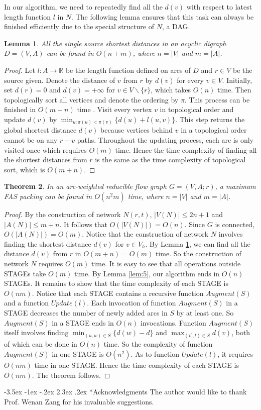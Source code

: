 \documentclass[11pt]{article}
\makeatletter
\newtheorem{theorem}{Theorem}[section]
\newtheorem{lemma}[theorem]{Lemma}
\renewcommand\section{%
  \@startsection{section}{1}
                {\z@}%
                {-3.5ex \@plus -1ex \@minus -.2ex}%
                {2.3ex \@plus.2ex}%
                {\large\bfseries}%
}
\makeatother
\begin{document}
In our algorithm, we need to repeatedly find all the $d(v)$ with respect to latest length function $l$ in $N$. The following lemma ensures that this task can always be finished efficiently due to the special structure of $N$, a DAG.

\begin{lemma}
\label{lem:6}
All the single source shortest distances in an acyclic digraph $D=(V,A)$ can be found in $O(n+m)$, where $n=\lvert V \rvert$ and $m=\lvert A \rvert$.
\end{lemma}
\begin{proof}
Let $l:A\rightarrow \mathbb{R}$ be the length function defined on arcs of $D$ and $r\in V$ be the source given. Denote the distance of $v$ from $r$ by $d(v)$ for every $v\in V$. Initially, set $d(r)=0$ and $d(v)=+\infty$ for $v\in V\backslash \{r\}$, which takes $O(n)$ time. Then topologically sort all vertices and denote the ordering by $\pi$. This process can be finished in $O(m+n)$ time \cite{AhMO}. Visit every vertex $v$ in topological order and update $d(v)$ by $\min_{u:\pi(u)<\pi(v)}\{d(u)+l(u,v)\}$. This step returns the global shortest distance $d(v)$ because vertices behind $v$ in a topological order cannot be on any $r-v$ paths. Throughout the updating process, each arc is only visited once which requires $O(m)$ time. Hence the time complexity of finding all the shortest distances from $r$ is the same as the time complexity of topological sort, which is $O(m+n)$.
\end{proof}

\begin{theorem}
\label{thm:5}
In an arc-weighted reducible flow graph $G=(V,A;r)$, a maximum FAS packing can be found in $O(n^2 m)$ time, where $n=\lvert V \rvert$ and $m=\lvert A \rvert$.
\end{theorem}
\begin{proof}
By the construction of network $N(r,t)$, $\lvert V(N)\rvert\leq 2n+1$ and $\lvert A(N)\rvert\leq m+n$. It follows that $O(\lvert V(N)\rvert)=O(n)$. Since $G$ is connected, $O(\lvert A(N)\rvert)=O(m)$. Notice that the construction of network $N$ involves finding the shortest distance $d(v)$ for $v\in V_h$. By Lemma \ref{lem:6}, we can find all the distance $d(v)$ from $r$ in $O(m+n)=O(m)$ time. So the construction of network $N$ requires $O(m)$ time. It is easy to see that all operations outside STAGEs take $O(m)$ time. By Lemma \ref{lem:5}, our algorithm ends in $O(n)$ STAGEs. It remains to show that the time complexity of each STAGE is $O(nm)$. Notice that each STAGE contains a recursive function $Augment(S)$ and a function $Update(l)$. Each invocation of function $Augment(S)$ in a STAGE decreases the number of newly added arcs in $S$ by at least one. So $Augment(S)$ in a STAGE ends in $O(n)$ invocations. Function $Augment(S)$ itself involves finding $\min_{(u,w)\in S}\{d(w)-d\}$ and $\max_{(v^\prime,t)\in S} d(v)$, both of which can be done in $O(n)$ time. So the complexity of function $Augment(S)$ in one STAGE is $O(n^2)$. As to function $Update(l)$, it requires $O(nm)$ time in one STAGE. Hence the time complexity of each STAGE is $O(nm)$. The theorem follows.
\end{proof}

\section*{Acknowledgments}
The author would like to thank Prof. Wenan Zang for his invaluable suggestions.



\nocite{CDHZ,DinZ,HecU2,Sham}
\end{document}
